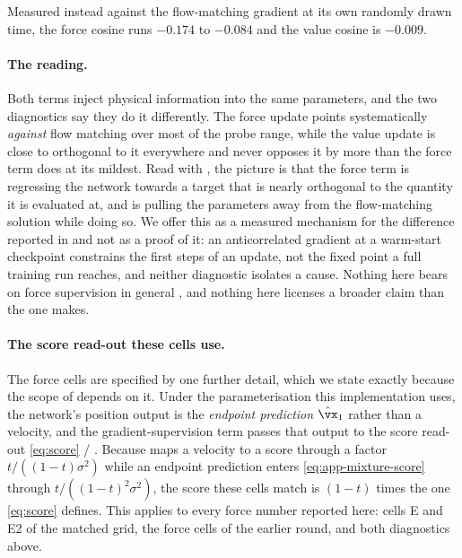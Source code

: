 Measured instead against the flow-matching gradient at its own randomly drawn time, the
force cosine runs $-0.174$ to $-0.084$ and the value cosine is $-0.009$.

\paragraph{The reading.} Both terms inject physical information into the same parameters,
and the two diagnostics say they do it differently. The force update points
systematically \emph{against} flow matching over most of the probe range, while the value
update is close to orthogonal to it everywhere and never opposes it by more than the
force term does at its mildest. Read with , the picture is that
the force term is regressing the network towards a target that is nearly orthogonal to
the quantity it is evaluated at, and is pulling the parameters away from the flow-matching
solution while doing so. We offer this as a measured mechanism for the difference reported
in  and not as a proof of it: an anticorrelated gradient at a warm-start
checkpoint constrains the first steps of an update, not the fixed point a full training run
reaches, and neither diagnostic isolates a cause. Nothing here bears on force supervision
in general \citep{psm,driftingboltzmann}, and nothing here licenses a broader claim than
the one  makes.

\paragraph{The score read-out these cells use.}
The force cells are specified by one further detail, which we state exactly because the
scope of  depends on it. Under the parameterisation this
implementation uses, the network's position output is the \emph{endpoint prediction}
$\hat{\vx}_1$ rather than a velocity, and the gradient-supervision term passes that output
to the score read-out \eqref{eq:score} / . Because  maps a
velocity to a score through a factor $t/((1-t)\sigma^2)$ while an endpoint prediction
enters \eqref{eq:app-mixture-score} through $t/((1-t)^2\sigma^2)$, the score these cells
match is $(1-t)$ times the one \eqref{eq:score} defines. This applies to every force
number reported here: cells E and E2 of the matched grid, the force cells of the earlier
round, and both diagnostics above.

